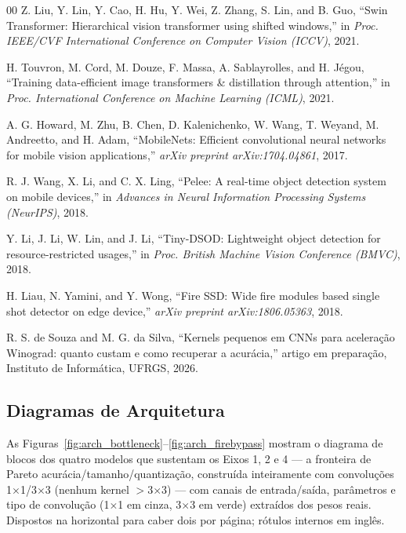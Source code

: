 \documentclass[conference]{IEEEtran}
\begin{document}
\begin{thebibliography}{00}
Z. Liu, Y. Lin, Y. Cao, H. Hu, Y. Wei, Z. Zhang, S. Lin, and B. Guo, ``Swin Transformer:
Hierarchical vision transformer using shifted windows,'' in \textit{Proc. IEEE/CVF International
Conference on Computer Vision (ICCV)}, 2021.

H. Touvron, M. Cord, M. Douze, F. Massa, A. Sablayrolles, and H. Jégou, ``Training data-efficient
image transformers \& distillation through attention,'' in \textit{Proc. International Conference
on Machine Learning (ICML)}, 2021.

A. G. Howard, M. Zhu, B. Chen, D. Kalenichenko, W. Wang, T. Weyand, M. Andreetto, and H. Adam,
``MobileNets: Efficient convolutional neural networks for mobile vision applications,''
\textit{arXiv preprint arXiv:1704.04861}, 2017.

R. J. Wang, X. Li, and C. X. Ling, ``Pelee: A real-time object detection system on mobile
devices,'' in \textit{Advances in Neural Information Processing Systems (NeurIPS)}, 2018.

Y. Li, J. Li, W. Lin, and J. Li, ``Tiny-DSOD: Lightweight object detection for resource-restricted
usages,'' in \textit{Proc. British Machine Vision Conference (BMVC)}, 2018.

H. Liau, N. Yamini, and Y. Wong, ``Fire SSD: Wide fire modules based single shot detector on edge
device,'' \textit{arXiv preprint arXiv:1806.05363}, 2018.

R. S. de Souza and M. G. da Silva, ``Kernels pequenos em CNNs para aceleração Winograd: quanto custam e
como recuperar a acurácia,'' artigo em preparação, Instituto de Informática, UFRGS, 2026.

\end{thebibliography}

\clearpage
\appendix
\subsection{Diagramas de Arquitetura}
\label{sec:apendice_arquiteturas}

As Figuras~\ref{fig:arch_bottleneck}--\ref{fig:arch_firebypass} mostram o diagrama de blocos dos
quatro modelos que sustentam os Eixos 1, 2 e 4 — a fronteira de Pareto acurácia/tamanho/quantização,
construída inteiramente com convoluções 1$\times$1/3$\times$3 (nenhum kernel $>$3$\times$3) — com
canais de entrada/saída, parâmetros e tipo de convolução (1$\times$1 em cinza, 3$\times$3 em verde)
extraídos dos pesos reais. Dispostos na horizontal para caber dois por página; rótulos internos em
inglês.
\end{document}
